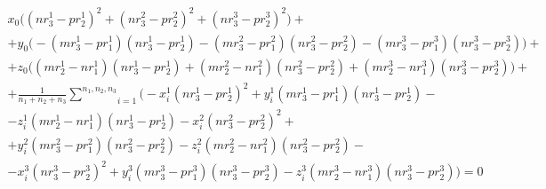 $$\begin{gathered}
	x_0 \bigg( (n r_3^1 - p r_2^1)^2 + (n r_3^2 - p r_2^2)^2 + (n r_3^3 - p r_2^3)^2 \bigg) + \\
	+ y_0 \bigg( -(m r_3^1 - p r_1^1) (n r_3^1 - p r_2^1) - (m r_3^2 - p r_1^2) (n r_3^2 - p r_2^2) - (m r_3^3 - p r_1^3) (n r_3^3 - p r_2^3) \bigg) + \\
	+ z_0 \bigg( (m r_2^1 - n r_1^1) (n r_3^1 - p r_2^1) + (m r_2^2 - n r_1^2) (n r_3^2 - p r_2^2) + (m r_2^3 - n r_1^3) (n r_3^3 - p r_2^3) \bigg) + \\
	+ \frac{1}{n_1+n_2+n_3} \underset{i=1}{\overset{n_1, n_2, n_3}{\sum}} \bigg( 
		- x_i^1 (n r_3^1 - p r_2^1)^2 +
		y_i^1 (m r_3^1 - p r_1^1) (n r_3^1 - p r_2^1) - \\
		- z_i^1  (m r_2^1 - n r_1^1) (n r_3^1 - p r_2^1) - 
		x_i^2 (n r_3^2 - p r_2^2)^2 + \\
		+ y_i^2  (m r_3^2 - p r_1^2) (n r_3^2 - p r_2^2) -
		z_i^2 (m r_2^2 - n r_1^2) (n r_3^2 - p r_2^2) - \\
		- x_i^3 (n r_3^3 - p r_2^3)^2 +
		y_i^3 (m r_3^3 - p r_1^3) (n r_3^3 - p r_2^3) -
		z_i^3 (m r_2^3 - n r_1^3) (n r_3^3 - p r_2^3)
	 \bigg) = 0
\end{gathered}$$

